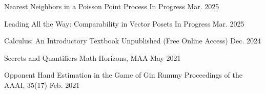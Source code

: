 


\vspace{0.7em}


\begin{cvitems}



\cvitemthree
  {Nearest Neighbors in a Poisson Point Process}
  {In Progress}
  {Mar. 2025}
  

\cvitemthree
  {Leading All the Way: Comparability in Vector Posets}
  {In Progress}
  {Mar. 2025}

\cvitemthree
  {Calculus: An Introductory Textbook}
  {Unpublished (Free Online Access)}
  {Dec. 2024}

  
  
\cvitemthree
  {Secrets and Quantifiers}
  {Math Horizons, MAA}
  {May 2021}


\cvitemthree
  {Opponent Hand Estimation in the Game of Gin Rummy}
  {Proceedings of the AAAI, 35(17)}
  {Feb. 2021}




  




\end{cvitems}

\vspace{1em}
